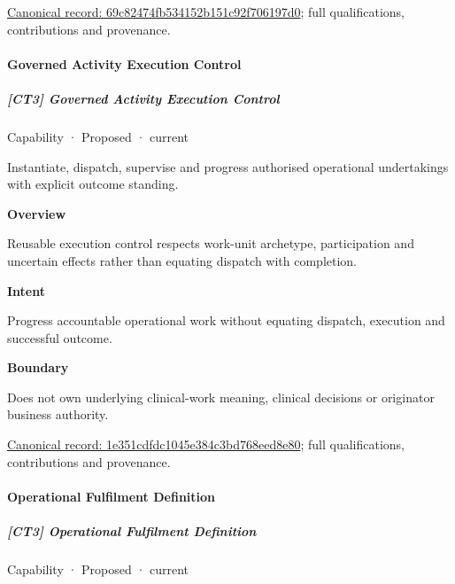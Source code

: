 {\footnotesize \href{../../../../continuum/strategy/capability/69c82474fb534152b151c92f706197d0.md}{Canonical record: 69c82474fb534152b151c92f706197d0}; full qualifications, contributions and provenance.}\par
\paragraph{Governed Activity Execution Control}

\subparagraph{[CT3] Governed Activity Execution Control}

\label{element:1e351cdfdc1045e384c3bd768eed8e80}
{\small Capability · Proposed · current}\par

Instantiate, dispatch, supervise and progress authorised operational undertakings with explicit outcome standing.



\textbf{Overview}



Reusable execution control respects work-unit archetype, participation and uncertain effects rather than equating dispatch with completion.



\textbf{Intent}



Progress accountable operational work without equating dispatch, execution and successful outcome.



\textbf{Boundary}



Does not own underlying clinical-work meaning, clinical decisions or originator business authority.


{\footnotesize \href{../../../../continuum/strategy/capability/1e351cdfdc1045e384c3bd768eed8e80.md}{Canonical record: 1e351cdfdc1045e384c3bd768eed8e80}; full qualifications, contributions and provenance.}\par
\paragraph{Operational Fulfilment Definition}

\subparagraph{[CT3] Operational Fulfilment Definition}

\label{element:2b52c0de17b146da962f303e99f90a4a}
{\small Capability · Proposed · current}\par

